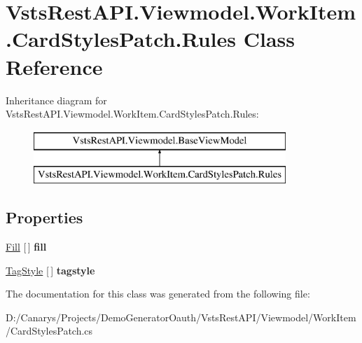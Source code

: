 \hypertarget{class_vsts_rest_a_p_i_1_1_viewmodel_1_1_work_item_1_1_card_styles_patch_1_1_rules}{}\section{Vsts\+Rest\+A\+P\+I.\+Viewmodel.\+Work\+Item.\+Card\+Styles\+Patch.\+Rules Class Reference}
\label{class_vsts_rest_a_p_i_1_1_viewmodel_1_1_work_item_1_1_card_styles_patch_1_1_rules}
Inheritance diagram for Vsts\+Rest\+A\+P\+I.\+Viewmodel.\+Work\+Item.\+Card\+Styles\+Patch.\+Rules\+:\begin{figure}[H]
\begin{center}
\leavevmode
\includegraphics[height=2.000000cm]{class_vsts_rest_a_p_i_1_1_viewmodel_1_1_work_item_1_1_card_styles_patch_1_1_rules}
\end{center}
\end{figure}
\subsection*{Properties}
\begin{DoxyCompactItemize}
\item 
\mbox{\label{class_vsts_rest_a_p_i_1_1_viewmodel_1_1_work_item_1_1_card_styles_patch_1_1_rules_a2f8f2febc87bf7919be781f603cafd74}} 
\mbox{\hyperlink{class_vsts_rest_a_p_i_1_1_viewmodel_1_1_work_item_1_1_card_styles_patch_1_1_fill}{Fill}} \mbox{[}$\,$\mbox{]} {\bfseries fill}
\item 
\mbox{\label{class_vsts_rest_a_p_i_1_1_viewmodel_1_1_work_item_1_1_card_styles_patch_1_1_rules_afc7900c8b7007cc1d340cf65645e91d0}} 
\mbox{\hyperlink{class_vsts_rest_a_p_i_1_1_viewmodel_1_1_work_item_1_1_card_styles_patch_1_1_tag_style}{Tag\+Style}} \mbox{[}$\,$\mbox{]} {\bfseries tagstyle}
\end{DoxyCompactItemize}


The documentation for this class was generated from the following file\+:\begin{DoxyCompactItemize}
\item 
D\+:/\+Canarys/\+Projects/\+Demo\+Generator\+Oauth/\+Vsts\+Rest\+A\+P\+I/\+Viewmodel/\+Work\+Item/Card\+Styles\+Patch.\+cs\end{DoxyCompactItemize}
